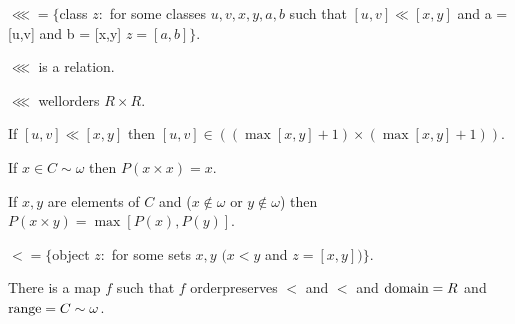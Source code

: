 \documentclass[a4paper,draft]{amsproc}
\begin{document}
\begin{forthel}
\begin{definition}
$\lll = \{$class $z :$ for some classes $u,v,x,y,a,b$ such that
	$[u,v] \ll [x,y]$ and a = [u,v] and b = [x,y] $z = [a,b]\}$.
\end{definition}

\begin{lemma}
$\lll$ is a relation.
\end{lemma}


\begin{theorem}[177]
$\lll$ wellorders $R \times R$.
\end{theorem}

\begin{theorem}[178]
If $[u,v] \ll [x,y]$ then $[u,v] \in ((\max[x,y] + 1) \times (\max[x,y] + 1))$.
\end{theorem}

\begin{theorem}[179]
If $x \in C \sim \omega$ then $P(x \times x) = x$.
\end{theorem}

\begin{theorem}[180]
If $x, y$ are elements of $C$ and ($x \notin \omega$ or $y \notin \omega$) then $P(x \times y) = \max[P(x),P(y)]$.
\end{theorem}

\begin{definition}
$< = \{$object $z :$ for some sets $x,y$ $(x < y$ and $z = [x,y])\}$.
\end{definition}

\begin{theorem}
There is a %
map $f$ such that $f$ orderpreserves $<$ and $<$ and $\domain f = R$ and $\range f = C \sim \omega$.
\end{theorem}

\end{forthel}
\end{document}
